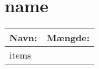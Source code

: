 \section*{ {{name}} }

\begin{tabular}{|l|l|}
  \hline
  \bf{Navn:} & \bf{Mængde:} \\
  \hline\hline
  {{items}}
  \hline
\end{tabular}
